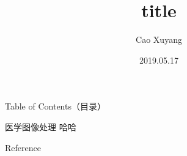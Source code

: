 \documentclass{beamer}
\title{title}
\author{Cao Xuyang}
\date{2019.05.17}
\begin{document}
\frame[plain]{\titlepage}                  %
\begin{frame}{Table of Contents（目录）}    %
    \setcounter{tocdepth}{1}        %
    \tableofcontents                %
\end{frame}
\begin{frame}{医学图像处理}
    \alert{哈哈}
\end{frame}{}



\begin{frame}{Reference}
    
    
  
\end{frame}
\end{document}
